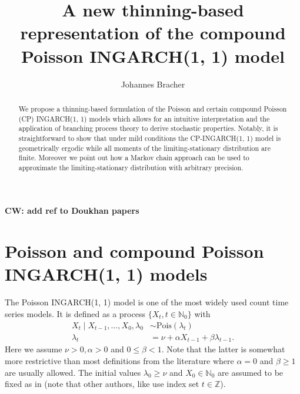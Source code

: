 \documentclass{article}
\begin{document}
\title{A new thinning-based representation of the compound Poisson INGARCH(1, 1) model}
\author{Johannes Bracher}


\newcommand{\juv}{S}

\maketitle


\begin{abstract}
We propose a thinning-based formulation of the Poisson and certain compound Poisson (CP) INGARCH(1, 1) models which allows for an intuitive interpretation and the application of branching process theory to derive stochastic properties. Notably, it is straightforward to show that under mild conditions the CP-INGARCH(1, 1) model is geometrically ergodic while all moments of the limiting-stationary distribution are finite. Moreover we point out how a Markov chain approach can be used to approximate the limiting-stationary distribution with arbitrary precision.
\end{abstract}



\textbf{CW: add ref to Doukhan papers}


\section{Poisson and compound Poisson INGARCH(1, 1) models}
\label{sec:original_formulation}

The Poisson INGARCH(1, 1) model \cite{Ferland2006, Fokianos2009} is one of the most widely used count time series models. It is defined as a process $\{X_t, t \in \mathbb{N}_0\}$ with
\begin{align}
X_t \mid X_{t - 1}, \dots, X_0, \lambda_0 & \sim \text{Pois}(\lambda_t)\label{eq:X_t_original}\\
\lambda_t & = \nu + \alpha X_{t - 1} + \beta \lambda_{t - 1}. \label{eq:lambda_t}
\end{align}
Here we assume $\nu > 0, \alpha > 0$ and $0 \leq \beta < 1$. Note that the latter is somewhat more restrictive than most definitions from the literature where $\alpha = 0$ and $\beta \geq 1$ are usually allowed. The initial values $\lambda_0 \geq \nu$ and $X_0 \in \mathbb{N}_0$ are assumed to be fixed as in \cite{Fokianos2009} (note that other authors, like \citep{Ferland2006} use index set $t \in \mathbb{Z}$).
\end{document}
